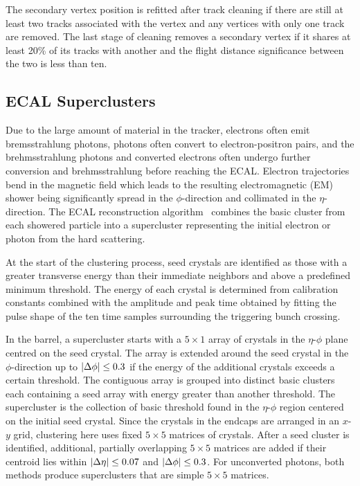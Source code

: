 The secondary vertex position is refitted after track cleaning if there are still at least two tracks associated with the vertex and any vertices with only one track are removed.
The last stage of cleaning removes a secondary vertex if it shares at least 20\% of its tracks with another and the flight distance significance between the two is less than ten.

\subsection{ECAL Superclusters}
\label{sec:pf_sc}

Due to the large amount of material in the tracker, electrons often emit bremsstrahlung photons, photons often convert to electron-positron pairs, and the brehmsstrahlung photons and converted electrons often undergo further conversion and brehmsstrahlung before reaching the ECAL.
Electron trajectories bend in the magnetic field which leads to the resulting electromagnetic (EM) shower being significantly spread in the $\phi$-direction and collimated in the $\eta$-direction.
The ECAL reconstruction algorithm~\cite{Electrons2015, Photons2015} combines the basic cluster from each showered particle into a supercluster representing the initial electron or photon from the hard scattering. 

At the start of the clustering process, seed crystals are identified as those with a greater transverse energy than their immediate neighbors and above a predefined minimum threshold.
The energy of each crystal is determined from calibration constants combined with the amplitude and peak time obtained by fitting the pulse shape of the ten time samples surrounding the triggering bunch crossing.

In the barrel, a supercluster starts with a $5\times1$ array of crystals in the $\eta$-$\phi$ plane centred on the seed crystal.
The array is extended around the seed crystal in the $\phi$-direction up to $\lvert \Delta\phi \rvert \le 0.3$ if the energy of the additional crystals exceeds a certain threshold. 
The contiguous array is grouped into distinct basic clusters each containing a seed array with energy greater than another threshold.
The supercluster is the collection of basic threshold found in the $\eta$-$\phi$ region centered on the initial seed crystal.
Since the crystals in the endcaps are arranged in an $x$-$y$ grid, clustering here uses fixed $5\times5$ matrices of crystals. 
After a seed cluster is identified, additional, partially overlapping $5\times5$ matrices are added if their centroid lies within $\lvert \Delta\eta \rvert \le 0.07$ and $\lvert \Delta\phi \rvert \le 0.3$.
For unconverted photons, both methods produce superclusters that are simple $5\times5$ matrices.
